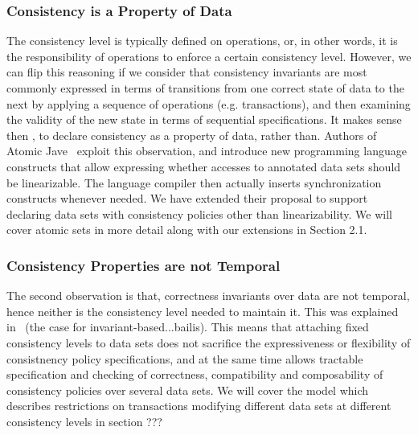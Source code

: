 \subsubsection{Consistency is a Property of Data}
The consistency level is typically defined on operations, or, in other words, it
is the responsibility of operations to enforce a certain consistency level.
However, we can flip this reasoning if we consider that consistency
invariants are most commonly expressed in terms of transitions from one correct
state of data to the next by applying a sequence of operations (e.g.
transactions), and then examining the validity of the new state
in terms of sequential specifications. It makes sense then , to declare
consistency as a property of data, rather than. Authors of Atomic Jave~\cite{Vaziri:2006:ASC:1111320.1111067} exploit this observation, and
introduce new programming language constructs that allow expressing whether
accesses to annotated data sets should be linearizable. The language compiler
then actually inserts synchronization constructs whenever needed. We have extended
their proposal to support declaring data sets with consistency policies other
than linearizability. We will cover atomic sets in more detail along with our
extensions in Section 2.1. \\

\subsubsection{Consistency Properties are not Temporal}
The second observation is that, correctness invariants over data are not temporal, hence
neither is the consistency level needed to maintain it. This was explained
in~\cite{bailis2014coordination} (the case for
invariant-based...bailis). This means that attaching fixed consistency levels to
data sets does not sacrifice the expressiveness or flexibility of consistnency
policy specifications, and at the same time allows tractable specification and checking of
correctness, compatibility and composability of consistency policies over
several data sets. We will cover the model which describes restrictions on
transactions modifying different data sets at different consistency levels in
section ??? \\

